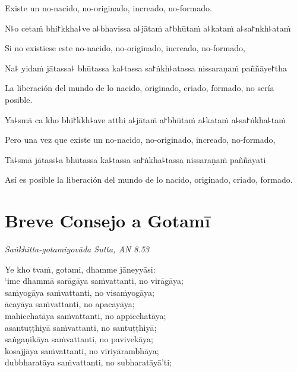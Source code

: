 \begin{english}
  Existe un no-nacido, no-originado, increado, no-formado.
\end{english}

N꜕o cetaṁ bhi꜓kkha꜕ve a꜕bhavissa a꜕jātaṁ a꜓bhūtaṁ a꜕kataṁ a꜕sa꜓nkh꜕ataṁ

\begin{english}
 Si no existiese este no-nacido, no-originado, increado, no-formado,
\end{english}

Na꜕ yidaṁ jātassa꜕ bhūtassa ka꜕tassa sa꜓ṅkh꜕atassa nissaraṇaṁ paññāye꜓tha

\begin{english}
  La liberación del mundo de lo nacido, originado, criado, formado, no sería posible.
\end{english}

Ya꜕smā ca kho bhi꜓kkh꜕ave atthi a꜕jātaṁ a꜓bhūtaṁ a꜕kataṁ a꜕sa꜓ṅkha꜕taṁ

\begin{english}
  Pero una vez que existe un no-nacido, no-originado, increado, no-formado,
\end{english}

Ta꜕smā jātass꜕a bhūtassa ka꜕tassa sa꜓ṅkha꜕tassa nissaraṇaṁ paññāyati

\begin{english}
  Así es posible la liberación del mundo de lo nacido, originado, criado, formado.
\end{english}

\chapter[Breve Consejo a Gotamī]{Breve Consejo a Gotamī}

\emph{Saṅkhitta-gotamiyovāda Sutta, AN 8.53}


\begin{leader}
\end{leader}

Ye kho tvaṁ, gotami, dhamme jāneyyāsi:\\
‘ime dhammā sarāgāya saṁvattanti, no virāgāya;\\
saṁyogāya saṁvattanti, no visaṁyogāya;\\
ācayāya saṁvattanti, no apacayāya;\\
mahicchatāya saṁvattanti, no appicchatāya;\\
asantuṭṭhiyā saṁvattanti, no santuṭṭhiyā;\\
saṅgaṇikāya saṁvattanti, no pavivekāya;\\
kosajjāya saṁvattanti, no vīriyārambhāya;\\
dubbharatāya saṁvattanti, no subharatāyā’ti;

